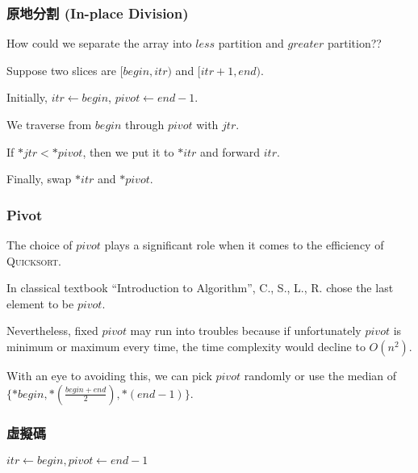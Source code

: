 \documentclass{beamer}
\begin{document}
\frame
{
	\frametitle{原地分割 (In-place Division)}
	
	How could we separate the array into $less$ partition and $greater$ partition??\pause
	
	Suppose two slices are $[begin, itr)$ and $[itr + 1, end)$.\pause
	
	Initially, $itr\gets begin$, $pivot\gets end-1$.\pause
	
	We traverse from $begin$ through $pivot$ with $jtr$.\pause
	
	If $*jtr < *pivot$, then we put it to $*itr$ and forward $itr$.\pause
	
	Finally, swap $*itr$ and $*pivot$.
}

\frame
{
	\frametitle{Pivot}
	
	The choice of $pivot$ plays a significant role when it comes to the efficiency of \textsc{Quicksort}.\pause
	
	In classical textbook ``Introduction to Algorithm'', C., S., L., R. chose the last element to be $pivot$.\pause
	
	Nevertheless, fixed $pivot$ may run into troubles because if unfortunately $pivot$ is minimum or maximum every time, the time complexity would decline to $O(n^2)$.\pause
	
	With an eye to avoiding this, we can pick $pivot$ randomly or use the median of $\{*begin, *(\frac{begin+end}{2}), *(end-1)\}$.
}

\frame
{
	\frametitle{虛擬碼}
	
	\begin{algorithmic}
			\pause
				\State\Return
			\EndIf
			\pause
            \State$itr\gets begin, pivot\gets end-1$
                    \State{}
                \EndIf
            \EndFor
            \State{}
            \pause
            \State{}
            \State{}
            \pause
            \State{}
        \EndProcedure
	\end{algorithmic}
}
\end{document}
